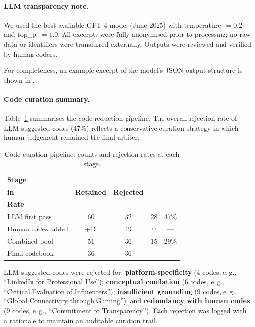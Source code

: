\paragraph{LLM transparency note.}
We used the best available GPT-4 model (June 2025) with temperature~$=0.2$ and top\_p~$=1.0$. All excerpts were fully anonymised prior to processing; no raw data or identifiers were transferred externally. Outputs were reviewed and verified by human coders.

For completeness, an example excerpt of the model's JSON output structure is shown in .

\paragraph{Code curation summary.}\label{app:code-curation}
Table~\ref{tab:code-curation} summarises the code reduction pipeline. The overall rejection rate of LLM-suggested codes (47\%) reflects a conservative curation strategy in which human judgement remained the final arbiter.

\vspace{-2pt}
\begin{table}[H]
\centering
\small
\caption{Code curation pipeline: counts and rejection rates at each stage.}
\label{tab:code-curation}
\setlength{\abovecaptionskip}{4pt}
\setlength{\belowcaptionskip}{2pt}
\begin{tabular}{lcccc}
\toprule
\textbf{Stage} & \makecell{\textbf{Codes}\\\textbf{in}} & \textbf{Retained} & \textbf{Rejected} & \makecell{\textbf{Rej.}\\\textbf{Rate}} \\
\midrule
LLM first pass    & 60  & 32 & 28 & 47\% \\
Human codes added  & +19 & 19 & 0  & ---  \\
Combined pool      & 51  & 36 & 15 & 29\% \\
Final codebook     & 36  & 36 & --- & ---  \\
\bottomrule
\end{tabular}
\end{table}
\vspace{-4pt}

\noindent LLM-suggested codes were rejected for: \textbf{platform-specificity} (4 codes, e.\,g., ``LinkedIn for Professional Use''); \textbf{conceptual conflation} (6 codes, e.\,g., ``Critical Evaluation of Influencers''); \textbf{insufficient grounding} (9 codes, e.\,g., ``Global Connectivity through Gaming''); and \textbf{redundancy with human codes} (9 codes, e.\,g., ``Commitment to Transparency''). Each rejection was logged with a rationale to maintain an auditable curation trail.

